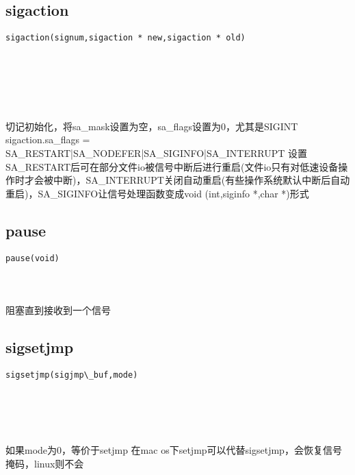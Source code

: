 \documentclass[10pt,a4paper]{article}
\begin{document}
\subsection{sigaction}
\begin{spacing}{2.0}
\lstset{language=C,numbers=none}
\begin{lstlisting}
sigaction(signum,sigaction * new,sigaction * old)
\end{lstlisting}
{\large\color[rgb]{0.2,0.4,0.6}{signum:}} \\
{\large\color[rgb]{0.2,0.4,0.6}{new:}} \\
{\large\color[rgb]{0.2,0.4,0.6}{old:}}
\paragraph{ \ \ }切记初始化，将sa\_mask设置为空，sa\_flags设置为0，尤其是SIGINT sigaction.sa\_flags = SA\_RESTART|SA\_NODEFER|SA\_SIGINFO|SA\_INTERRUPT 设置SA\_RESTART后可在部分文件io被信号中断后进行重启(文件io只有对低速设备操作时才会被中断)，SA\_INTERRUPT关闭自动重启(有些操作系统默认中断后自动重启)，SA\_SIGINFO让信号处理函数变成void (int,siginfo *,char *)形式
\end{spacing}

\subsection{pause}
\begin{spacing}{2.0}
\lstset{language=C,numbers=none}
\begin{lstlisting}
pause(void)
\end{lstlisting}
{\large\color[rgb]{0.2,0.4,0.6}{void:}}
\paragraph{ \ \ }阻塞直到接收到一个信号
\end{spacing}

\subsection{sigsetjmp}
\begin{spacing}{2.0}
\lstset{language=C,numbers=none}
\begin{lstlisting}
sigsetjmp(sigjmp\_buf,mode)
\end{lstlisting}
{\large\color[rgb]{0.2,0.4,0.6}{sigjmp\_buf:}} \\
{\large\color[rgb]{0.2,0.4,0.6}{mode:}}
\paragraph{ \ \ }如果mode为0，等价于setjmp 在mac os下setjmp可以代替sigsetjmp，会恢复信号掩码，linux则不会
\end{spacing}
\end{document}
